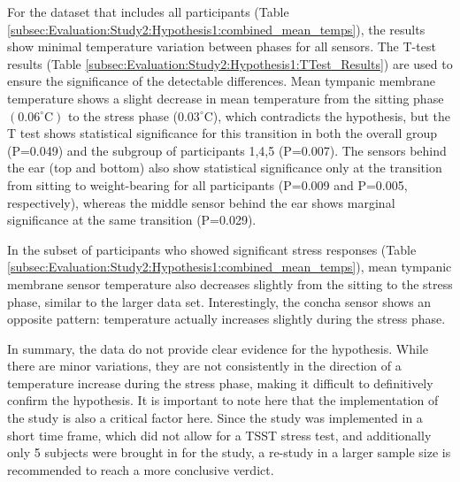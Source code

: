For the dataset that includes all participants (Table \ref{subsec:Evaluation:Study2:Hypothesis1:combined_mean_temps}), the results show minimal temperature variation between phases for all sensors. 
The T-test results (Table \ref{subsec:Evaluation:Study2:Hypothesis1:TTest_Results}) are used to ensure the significance of the detectable differences.
Mean tympanic membrane temperature shows a slight decrease in mean temperature from the sitting phase $(0.06^\circ \text{C})$ to the stress phase ($0.03^\circ \text{C}$), which contradicts the hypothesis, but the T test shows statistical significance for this transition in both the overall group (P=0.049) and the subgroup of participants 1,4,5 (P=0.007). 
The sensors behind the ear (top and bottom) also show statistical significance only at the transition from sitting to weight-bearing for all participants (P=0.009 and P=0.005, respectively), whereas the middle sensor behind the ear shows marginal significance at the same transition (P=0.029).

In the subset of participants who showed significant stress responses (Table \ref{subsec:Evaluation:Study2:Hypothesis1:combined_mean_temps}), mean tympanic membrane sensor temperature also decreases slightly from the sitting to the stress phase, similar to the larger data set. 
Interestingly, the concha sensor shows an opposite pattern: temperature actually increases slightly during the stress phase.

In summary, the data do not provide clear evidence for the hypothesis. 
While there are minor variations, they are not consistently in the direction of a temperature increase during the stress phase, making it difficult to definitively confirm the hypothesis. 
It is important to note here that the implementation of the study is also a critical factor here. 
Since the study was implemented in a short time frame, which did not allow for a TSST stress test, and additionally only 5 subjects were brought in for the study, a re-study in a larger sample size is recommended to reach a more conclusive verdict.

